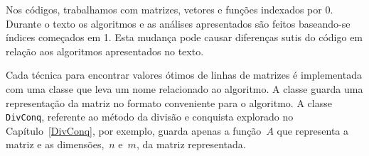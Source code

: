 Nos códigos, trabalhamos com matrizes, vetores e funções indexados por 0. Durante o texto os algoritmos e as análises apresentados são feitos baseando-se índices começados em 1. Esta mudança pode causar diferenças sutis do código em relação aos algoritmos apresentados no texto.

Cada técnica para encontrar valores ótimos de linhas de matrizes é implementada com uma classe que leva um nome relacionado ao algoritmo. A classe guarda uma representação da matriz no formato conveniente para o algoritmo. A classe \texttt{DivConq}, referente ao método da divisão e conquista explorado no Capítulo~\ref{DivConq}, por exemplo, guarda apenas a função~$A$ que representa a matriz e as dimensões,~$n$ e~$m$, da matriz representada.
